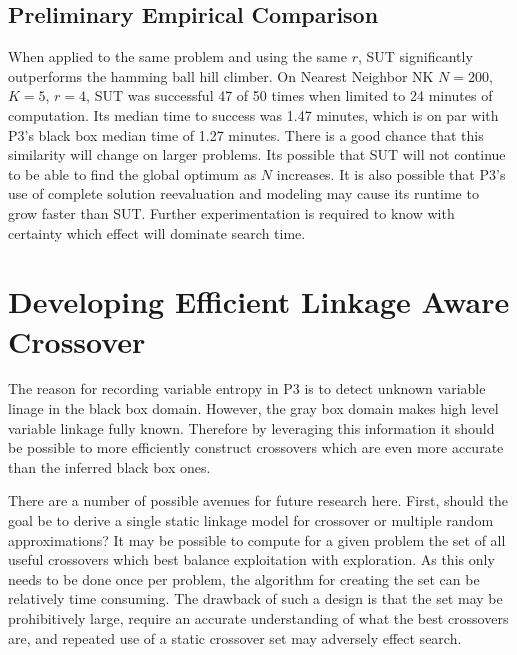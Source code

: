 \subsection{Preliminary Empirical Comparison}
When applied to the same problem and using the same $r$, SUT significantly outperforms the hamming ball hill climber.
On Nearest Neighbor NK $N=200$, $K=5$, $r=4$, SUT was successful 47 of 50 times when limited to 24 minutes of computation.
Its median time to success was 1.47 minutes, which is on par with P3's black box median time of 1.27 minutes.
There is a good chance that this similarity will change on larger problems. Its possible that SUT will not
continue to be able to find the global optimum as $N$ increases. It is also possible that P3's use of complete solution
reevaluation and modeling may cause its runtime to grow faster than SUT. Further experimentation is required to know
with certainty which effect will dominate search time.

\section{Developing Efficient Linkage Aware Crossover}
The reason for recording variable entropy in P3 is to detect unknown variable linage in the black box domain. However,
the gray box domain makes high level variable linkage fully known. Therefore by leveraging this information it should
be possible to more efficiently construct crossovers which are even more accurate than the inferred black box ones.

There are a number of possible avenues for future research here. First, should the goal be to derive a single
static linkage model for crossover or multiple random approximations? It may be possible to compute for
a given problem the set of all useful crossovers which best balance exploitation with exploration. As
this only needs to be done once per problem, the algorithm for creating the set can be relatively time consuming.
The drawback of such a design is that the set may be prohibitively large, require an accurate understanding of what
the best crossovers are, and repeated use of a static crossover set may adversely effect search.

